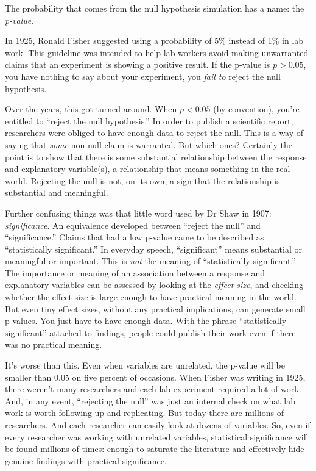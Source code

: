 \documentclass[]{tufte-book}
\begin{document}
The probability that comes from the null hypothesis simulation has a name: the \emph{p-value}.

In 1925, Ronald Fisher suggested using a probability of 5\% instead of 1\% in lab work. This guideline was intended to help lab workers avoid making unwarranted claims that an experiment is showing a positive result. If the p-value is \(p > 0.05\), you have nothing to say about your experiment, you \emph{fail to} reject the null hypothesis.

Over the years, this got turned around. When \(p < 0.05\) (by convention), you're entitled to ``reject the null hypothesis.'' In order to publish a scientific report, researchers were obliged to have enough data to reject the null. This is a way of saying that \emph{some} non-null claim is warranted. But which ones? Certainly the point is to show that there is some substantial relationship between the response and explanatory variable(s), a relationship that means something in the real world. Rejecting the null is not, on its own, a sign that the relationship is substantial and meaningful.

Further confusing things was that little word used by Dr Shaw in 1907: \emph{significance}. An equivalence developed between ``reject the null'' and ``significance.'' Claims that had a low p-value came to be described as ``statistically significant.'' In everyday speech, ``significant'' means substantial or meaningful or important. This is \emph{not} the meaning of ``statistically significant.'' The importance or meaning of an association between a response and explanatory variables can be assessed by looking at the \emph{effect size}, and checking whether the effect size is large enough to have practical meaning in the world. But even tiny effect sizes, without any practical implications, can generate small p-values. You just have to have enough data. With the phrase ``statistically significant'' attached to findings, people could publish their work even if there was no practical meaning.

It's worse than this. Even when variables are unrelated, the p-value will be smaller than 0.05 on five percent of occasions. When Fisher was writing in 1925, there weren't many researchers and each lab experiment required a lot of work. And, in any event, ``rejecting the null'' was just an internal check on what lab work is worth following up and replicating. But today there are millions of researchers. And each researcher can easily look at dozens of variables. So, even if every researcher was working with unrelated variables, statistical significance will be found millions of times: enough to saturate the literature and effectively hide genuine findings with practical significance.
\end{document}
